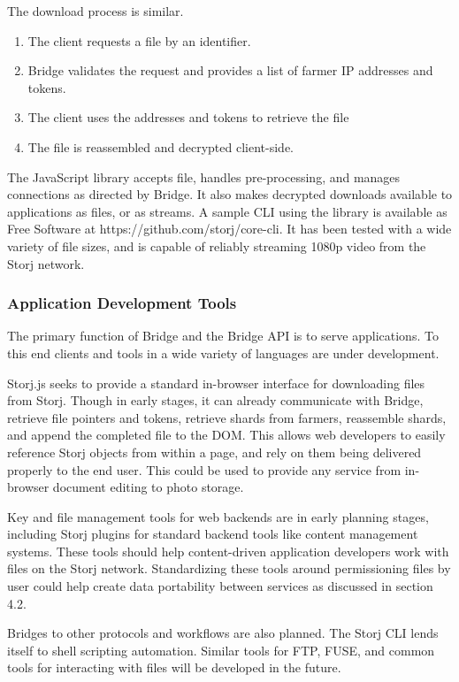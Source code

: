 \documentclass[a4paper,10pt]{article}
\begin{document}
The download process is similar.

\begin{enumerate}
\item The client requests a file by an identifier.
\item Bridge validates the request and provides a list of farmer IP addresses
and tokens.
\item The client uses the addresses and tokens to retrieve the file
\item The file is reassembled and decrypted client-side.
\end{enumerate}

The JavaScript library accepts file, handles pre-processing, and manages
connections as directed by Bridge. It also makes decrypted downloads available
to applications as files, or as streams. A sample CLI using the library is
available as Free Software at https://github.com/storj/core-cli. It has been
tested with a wide variety of file sizes, and is capable of reliably streaming
1080p video from the Storj network.

\subsubsection{Application Development Tools}
The primary function of Bridge and the Bridge API is to serve applications. To
this end clients and tools in a wide variety of languages are under development.

Storj.js\cite{28} seeks to provide a standard in-browser interface for
downloading files from Storj. Though in early stages, it can already communicate
with Bridge, retrieve file pointers and tokens, retrieve shards from farmers,
reassemble shards, and append the completed file to the DOM. This allows web
developers to easily reference Storj objects from within a page, and rely on
them being delivered properly to the end user. This could be used to provide any
service from in-browser document editing to photo storage.

Key and file management tools for web backends are in early planning stages,
including Storj plugins for standard backend tools like content management
systems. These tools should help content-driven application developers work with
files on the Storj network. Standardizing these tools around permissioning files
by user could help create data portability between services as discussed in
section 4.2.

Bridges to other protocols and workflows are also planned. The Storj CLI lends
itself to shell scripting automation. Similar tools for FTP, FUSE, and common
tools for interacting with files will be developed in the future.
\end{document}
